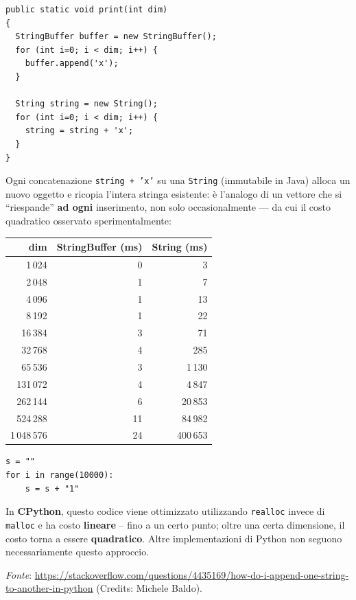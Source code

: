 \documentclass[12pt, a4paper]{article}
\begin{document}
\begin{tcolorbox}[colback=lightergray!5, colframe=tocsubsec, title=\textbf{Non Ancora Convinti? String vs StringBuffer}]
\begin{verbatim}
public static void print(int dim)
{
  StringBuffer buffer = new StringBuffer();
  for (int i=0; i < dim; i++) {
    buffer.append('x');
  }

  String string = new String();
  for (int i=0; i < dim; i++) {
    string = string + 'x';
  }
}
\end{verbatim}
Ogni concatenazione \texttt{string + 'x'} su una \texttt{String} (immutabile in Java) alloca un nuovo oggetto e ricopia l'intera stringa esistente: è l'analogo di un vettore che si ``riespande'' \textbf{ad ogni} inserimento, non solo occasionalmente — da cui il costo quadratico osservato sperimentalmente:
\begin{center}
\begin{tabular}{rrr}
\toprule
\textbf{dim} & \textbf{StringBuffer (ms)} & \textbf{String (ms)} \\
\midrule
1\,024     & 0  & 3 \\
2\,048     & 1  & 7 \\
4\,096     & 1  & 13 \\
8\,192     & 1  & 22 \\
16\,384    & 3  & 71 \\
32\,768    & 4  & 285 \\
65\,536    & 3  & 1\,130 \\
131\,072   & 4  & 4\,847 \\
262\,144   & 6  & 20\,853 \\
524\,288   & 11 & 84\,982 \\
1\,048\,576 & 24 & 400\,653 \\
\bottomrule
\end{tabular}
\end{center}
\end{tcolorbox}

\begin{tcolorbox}[colback=lightergray!5, colframe=tocsubsec, title=\textbf{Non Ancora Soddisfatti? Somma di Stringhe in Python}]
\begin{verbatim}
s = ""
for i in range(10000):
    s = s + "1"
\end{verbatim}
In \textbf{CPython}, questo codice viene ottimizzato utilizzando \texttt{realloc} invece di \texttt{malloc} e ha costo \textbf{lineare} -- fino a un certo punto; oltre una certa dimensione, il costo torna a essere \textbf{quadratico}. Altre implementazioni di Python non seguono necessariamente questo approccio.

\textit{Fonte}: \url{https://stackoverflow.com/questions/4435169/how-do-i-append-one-string-to-another-in-python} (Credits: Michele Baldo).
\end{tcolorbox}
\end{document}
